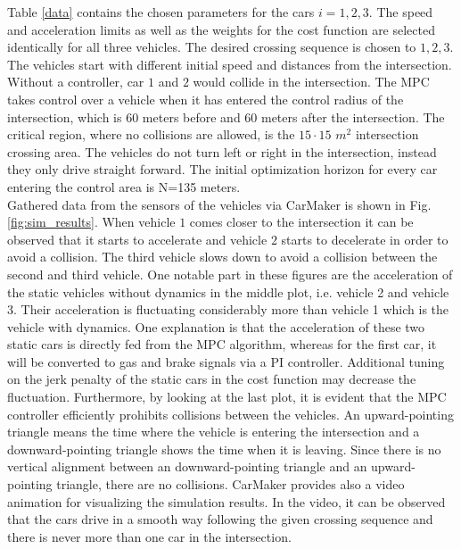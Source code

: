 \documentclass[letterpaper,10pt,conference]{ieeeconf}
\begin{document}
Table \ref{data} contains the chosen parameters for the cars $i=1,2,3$. The speed and acceleration limits as well as the weights for the cost function are selected identically for all three vehicles. The desired crossing sequence is chosen to $1,2,3$. The vehicles start with different initial speed and distances from the intersection. Without a controller, car $1$ and $2$ would collide in the intersection. The MPC takes control over a vehicle when it has entered the control radius of the intersection, which is $60$ meters before and $60$ meters after the intersection. The critical region, where no collisions are allowed, is the $15\cdot15$ $m^2$ intersection crossing area. The vehicles do not turn left or right in the intersection, instead they only drive straight forward. The initial optimization horizon for every car entering the control area is N=135 meters.\\ \indent
Gathered data from the sensors of the vehicles via CarMaker is shown in Fig. \ref{fig:sim_results}. When vehicle $1$ comes closer to the intersection it can be observed that it starts to accelerate and vehicle $2$ starts to decelerate in order to avoid a collision. The third vehicle slows down to avoid a collision between the second and third vehicle. One notable part in these figures are the acceleration of the static vehicles without dynamics in the middle plot, i.e. vehicle 2 and vehicle 3. Their acceleration is fluctuating considerably more than vehicle 1 which is the vehicle with dynamics. One explanation is that the acceleration of these two static cars is directly fed from the MPC algorithm, whereas for the first car, it will be converted to gas and brake signals via a PI controller. Additional tuning on the jerk penalty of the static cars in the cost function may decrease the fluctuation. Furthermore, by looking at the last plot, it is evident that the MPC controller efficiently prohibits collisions  between the vehicles. An upward-pointing triangle means the time where the vehicle is entering the intersection and a downward-pointing triangle shows the time when it is leaving. Since there is no vertical alignment between an downward-pointing triangle and an upward-pointing triangle, there are no collisions. CarMaker provides also a video animation for visualizing the simulation results. In the video, it can be observed that the cars drive in a smooth way following the given crossing sequence and there is never more than one car in the intersection.
\end{document}
